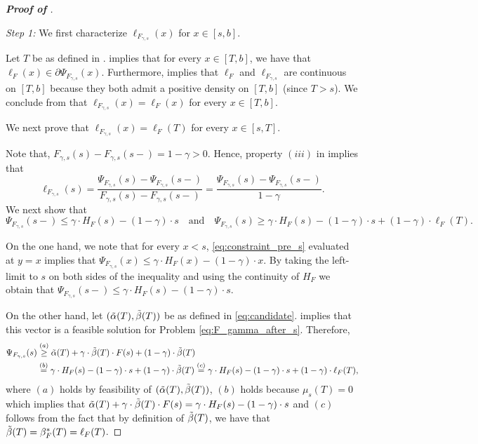 \begin{proof}[\textbf{Proof of }]~

\noindent  \textit{Step 1:}  We first characterize $\ell_{F_{\gamma,s}}(x)$ for $x \in [s,b]$.

Let $T$ be as defined in . 
 implies that for every $x \in [T,b]$, we have that $\ell_{F}(x) \in \partial \Psi_{F_{\gamma,s}}(x)$. Furthermore,  implies that $\ell_F$ and $\ell_{F_{\gamma,s}}$ are continuous on $[T,b]$ because they both admit a positive density on $[T,b]$ (since $T > s$). We conclude from  that $\ell_{F_{\gamma,s}}(x) = \ell_{F}(x)$ for every $x \in [T,b]$.


We next prove that $\ell_{F_{\gamma,s}}(x) = \ell_{F}(T)$ for every $x \in [s,T]$. 

Note that, $F_{\gamma,s}(s) - F_{\gamma,s}(s-) = 1- \gamma > 0$. Hence, property $(iii)$ in  implies that
\begin{equation}
\label{eq:l_s_monteiro}
\ell_{F_{\gamma,s}}(s) = \frac{\Psi_{F_{\gamma,s}}(s)-\Psi_{F_{\gamma,s}}(s-)}{F_{\gamma,s}(s)-F_{\gamma,s}(s-)} = \frac{\Psi_{F_{\gamma,s}}(s)-\Psi_{F_{\gamma,s}}(s-)}{1-\gamma}.
\end{equation}
We next show that
\begin{equation}
\label{eq:bounds_psi_s}
    \Psi_{F_{\gamma,s}}(s-) \leq \gamma \cdot H_{F}(s) - (1-\gamma) \cdot s \quad \mbox{and} \quad  \Psi_{F_{\gamma,s}}(s) \geq \gamma \cdot H_{F}(s) - (1-\gamma) \cdot s + (1-\gamma) \cdot \ell_{F}(T).
\end{equation}

On the one hand, we note that for every $x < s$, \eqref{eq:constraint_pre_s} evaluated at $y = x$ implies that $\Psi_{F_{\gamma,s}}(x) \leq \gamma \cdot H_{F}(x) - (1-\gamma) \cdot x$. By taking the  left-limit to $s$ on both sides of the inequality and using the continuity of $H_{F}$ we obtain that $\Psi_{F_{\gamma,s}}(s-) \leq \gamma \cdot H_{F}(s) - (1-\gamma) \cdot s.$

On the other hand, let  $(\aFs[T],\bFs[T])$ be as defined in \eqref{eq:candidate}.  implies that this vector is a feasible solution for Problem \eqref{eq:F_gamma_after_s}.  Therefore, 
\begin{align*}
\Psi_{F_{\gamma,s}}(s) &\stackrel{(a)}{\geq} \aFs[T] + \gamma \cdot \bFs[T] \cdot F(s) + (1-\gamma) \cdot \bFs[T]\\
&\stackrel{(b)}{=} \gamma \cdot H_{F}(s) - (1-\gamma) \cdot s + (1-\gamma) \cdot \bFs[T] \stackrel{(c)}{=}  \gamma \cdot H_{F}(s) - (1-\gamma) \cdot s + (1-\gamma) \cdot \ell_{F}(T),
\end{align*}
where $(a)$ holds by feasibility of $(\aFs[T],\bFs[T])$, $(b)$ holds because $\mu_s(T) = 0$ which implies that $\aFs[T] + \gamma \cdot \bFs[T] \cdot F(s) = \gamma \cdot H_{F}(s) - (1-\gamma)\cdot s$ and $(c)$ follows from the fact that by definition of $\bFs[T]$, we have that $\bFs[T] = \bF[T] = \ell_{F}(T)$.


\end{proof}
